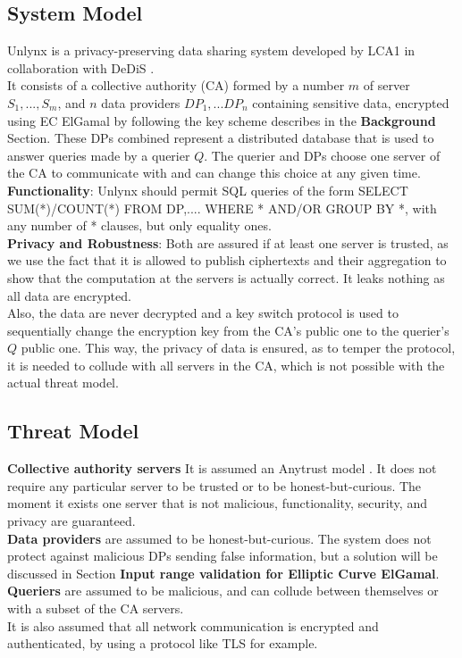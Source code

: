 \documentclass{article}
\begin{document}
\subsection{System Model}
Unlynx is a privacy-preserving data sharing system developed by LCA1 \cite{lca} in collaboration with DeDiS \cite{dedis}.\\
It consists of a collective authority (CA) formed by a number $m$ of server $S_1,...,S_m$, and $n$ data providers $DP_1,...DP_n$ containing sensitive data, encrypted using EC ElGamal by following the key scheme describes in the \textbf{Background} Section. These DPs combined represent a distributed database that is used to answer queries made by a querier $Q$. The querier and DPs choose one server of the CA to communicate with and can change this choice at any given time.\\
\textbf{Functionality}: Unlynx should permit SQL queries of the form SELECT SUM(*)/COUNT(*) FROM DP,.... WHERE * AND/OR GROUP BY *, with any number of * clauses, but only equality ones.\\
\textbf{Privacy and Robustness}: Both are assured if at least one server is trusted, as we use the fact that it is allowed to publish ciphertexts and their aggregation to show that the computation at the servers is actually correct. It leaks nothing as all data are encrypted.\\
Also, the data are never decrypted and a key switch protocol is used to sequentially change the encryption key from the CA's public one to the querier's $Q$ public one. This way, the privacy of data is ensured, as to temper the protocol, it is needed to collude with all servers in the CA, which is not possible with the actual threat model.

\subsection{Threat Model}
\textbf{Collective authority servers} It is assumed an Anytrust model \cite{anytrust}. It does not require any particular server to be trusted or to be honest-but-curious. The moment it exists one server that is not malicious, functionality, security, and privacy are guaranteed.\\
\textbf{Data providers} are assumed to be honest-but-curious. The system does not protect against malicious DPs sending false information, but a solution will be discussed  in Section \textbf{Input range validation for Elliptic Curve ElGamal}.\\
\textbf{Queriers} are assumed to be malicious, and can collude between themselves or with a subset of the CA servers.\\
It is also assumed that all network communication is encrypted and authenticated, by using a protocol like TLS for example.
\end{document}
